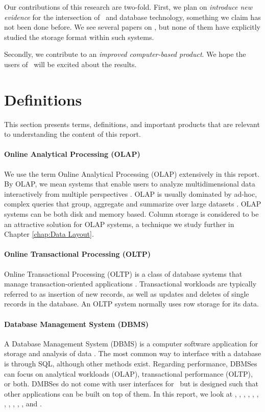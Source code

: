 Our contributions of this research are two-fold. First, we plan on \textit{introduce new evidence} for the intersection of \mdd~and database technology, something we claim has not been done before. We see several papers on \mdd, but none of them have explicitly studied the storage format within such systems.

Secondly, we contribute to an \textit{improved computer-based product}. We hope the users of \gap~will be excited about the results.


\section{Definitions}
\label{sec:Definitions}
This section presents terms, definitions, and important products that are relevant to understanding the content of this report.

\paragraph{Online Analytical Processing (OLAP)}
\label{par:Online Analytical Processing (OLAP)}
  We use the term Online Analytical Processing (OLAP) extensively in this report. By OLAP, we mean systems that enable users to analyze multidimensional data interactively from multiple perspectives \cite{Wikipedia_contributors2015-hw}. OLAP is usually dominated by ad-hoc, complex queries that group, aggregate and summarize over large datasets \cite{Bjorklund2011-wh}. OLAP systems can be both disk and memory based. Column storage is considered to be an attractive solution for OLAP systems, a technique we study further in Chapter \ref{chap:Data Layout}.


\paragraph{Online Transactional Processing (OLTP)}
\label{par:Online Transactional Processing (OLTP)}
Online Transactional Processing (OLTP) is a class of database systems that manage transaction-oriented applications \cite{Wikipedia_contributors2015-cw}. Transactional workloads are typically referred to as insertion of new records, as well as updates and deletes of single records in the database. An OLTP system normally uses row storage for its data.

\paragraph{Database Management System (DBMS)}
\label{par:Database Management System (DBMS)}
A Database Management System (DBMS) is a computer software application for storage and analysis of data \cite{Wikipedia_contributors2015-pb}. The most common way to interface with a database is through SQL, although other methods exist. Regarding performance, DBMSes can focus on analytical workloads (OLAP), transactional performance (OLTP), or both. DMBSes do not come with user interfaces for \bd~but is designed such that other applications can be built on top of them. In this report, we look at \oracle, \ibm, \saph, \sapnw, \mssql, \cstore, \vertica, \blink, \exasol, \oracle, \hyper, and \hyrise.

